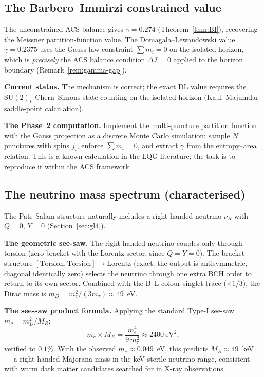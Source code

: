 \documentclass[11pt,a4paper]{article}
\theoremstyle{plain}
\theoremstyle{definition}
\theoremstyle{remark}
\newcommand{\DI}{\Delta\mathcal{I}}
\begin{document}
\subsection{The Barbero--Immirzi constrained value}

The unconstrained ACS balance gives $\gamma = 0.274$ (Theorem~\ref{thm:BI}),
recovering the Meissner partition-function value.  The Domagala--Lewandowski value
$\gamma = 0.2375$ uses the Gauss law constraint $\sum m_i = 0$ on the
isolated horizon, which is \emph{precisely} the ACS balance condition
$\DI = 0$ applied to the horizon boundary
(Remark~\ref{rem:gamma-gap}).

\textbf{Current status.}
The mechanism is correct; the exact DL value requires the
$\mathrm{SU}(2)_k$ Chern--Simons state-counting on the isolated
horizon (Kaul--Majumdar saddle-point calculation).

\textbf{The Phase~2 computation.}
Implement the multi-puncture partition function with the Gauss
projection as a discrete Monte Carlo simulation: sample $N$ punctures
with spins $j_i$, enforce $\sum m_i = 0$, and extract $\gamma$ from the
entropy--area relation.  This is a known calculation in the LQG literature;
the task is to reproduce it within the ACS framework.

\subsection{The neutrino mass spectrum (characterised)}

The Pati--Salam structure naturally includes a right-handed neutrino
$\nu_R$ with $Q = 0$, $Y = 0$ (Section~\ref{sec:gl4}).

\textbf{The geometric see-saw.}
The right-handed neutrino couples only through torsion (zero bracket
with the Lorentz sector, since $Q = Y = 0$).  The bracket structure
$[\mathrm{Torsion}, \mathrm{Torsion}] \to \mathrm{Lorentz}$ (exact:
the output is antisymmetric, diagonal identically zero) selects the
neutrino through one extra BCH order to return to its own sector.
Combined with the B--L colour-singlet trace ($\times 1/3$), the
Dirac mass is $m_D = m_e^2/(3m_\tau) \approx 49$~eV.

\textbf{The see-saw product formula.}
Applying the standard Type-I see-saw $m_\nu = m_D^2/M_R$:
\begin{equation}\label{eq:seesaw-product}
  m_\nu \times M_R = \frac{m_e^4}{9\,m_\tau^2} \approx 2400~\mathrm{eV}^2,
\end{equation}
verified to $0.1\%$.  With the observed $m_\nu \approx 0.049$~eV,
this predicts $M_R \approx 49$~keV --- a right-handed Majorana mass
in the keV sterile neutrino range, consistent with warm dark matter
candidates searched for in X-ray observations.
\end{document}

